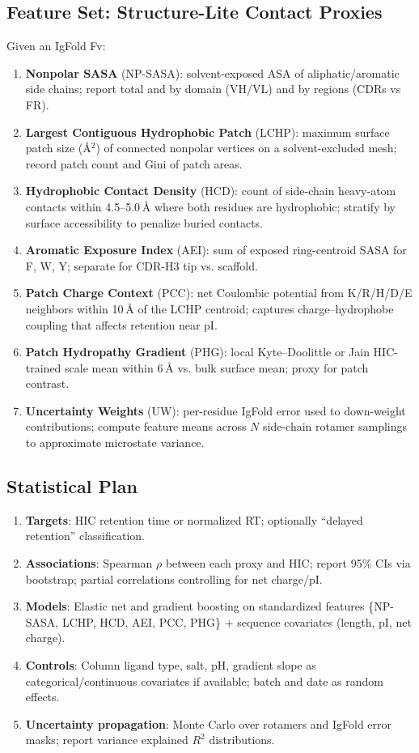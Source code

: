 \subsection*{Feature Set: Structure-Lite Contact Proxies}
Given an IgFold Fv:
\begin{enumerate}
\item \textbf{Nonpolar SASA} (NP-SASA): solvent-exposed ASA of aliphatic/aromatic side chains; report total and by domain (VH/VL) and by regions (CDRs vs FR). 
\item \textbf{Largest Contiguous Hydrophobic Patch} (LCHP): maximum surface patch size (Å$^{2}$) of connected nonpolar vertices on a solvent-excluded mesh; record patch count and Gini of patch areas.
\item \textbf{Hydrophobic Contact Density} (HCD): count of side-chain heavy-atom contacts within 4.5–5.0 Å where both residues are hydrophobic; stratify by surface accessibility to penalize buried contacts.
\item \textbf{Aromatic Exposure Index} (AEI): sum of exposed ring-centroid SASA for F, W, Y; separate for CDR-H3 tip vs. scaffold.
\item \textbf{Patch Charge Context} (PCC): net Coulombic potential from K/R/H/D/E neighbors within 10 Å of the LCHP centroid; captures charge–hydrophobe coupling that affects retention near pI.
\item \textbf{Patch Hydropathy Gradient} (PHG): local Kyte–Doolittle or Jain HIC-trained scale mean within 6 Å vs. bulk surface mean; proxy for patch contrast.
\item \textbf{Uncertainty Weights} (UW): per-residue IgFold error used to down-weight contributions; compute feature means across $N$ side-chain rotamer samplings to approximate microstate variance.
\end{enumerate}

\subsection*{Statistical Plan}
\begin{enumerate}
\item \textbf{Targets}: HIC retention time or normalized RT; optionally “delayed retention” classification.
\item \textbf{Associations}: Spearman $\rho$ between each proxy and HIC; report 95\% CIs via bootstrap; partial correlations controlling for net charge/pI.
\item \textbf{Models}: Elastic net and gradient boosting on standardized features \{\textsf{NP-SASA, LCHP, HCD, AEI, PCC, PHG}\} + sequence covariates (length, pI, net charge). 
\item \textbf{Controls}: Column ligand type, salt, pH, gradient slope as categorical/continuous covariates if available; batch and date as random effects.
\item \textbf{Uncertainty propagation}: Monte Carlo over rotamers and IgFold error masks; report variance explained $R^{2}$ distributions.
\end{enumerate}

